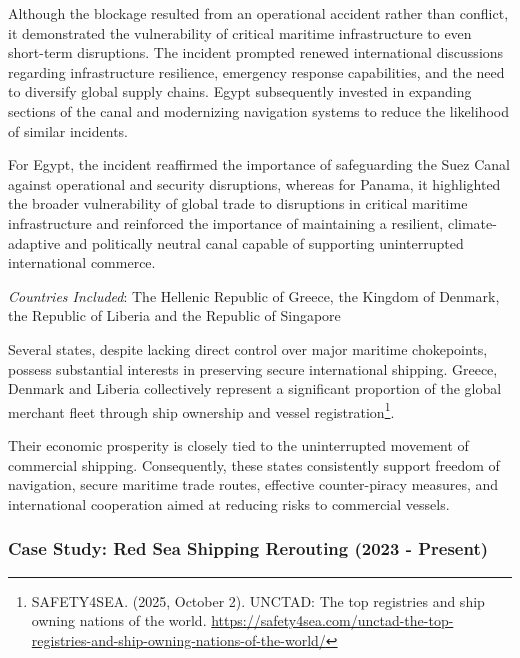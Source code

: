 Although the blockage resulted from an operational accident rather than conflict, it demonstrated the vulnerability of critical maritime infrastructure to even short-term disruptions. The incident prompted renewed international discussions regarding infrastructure resilience, emergency response capabilities, and the need to diversify global supply chains. Egypt subsequently invested in expanding sections of the canal and modernizing navigation systems to reduce the likelihood of similar incidents.

For Egypt, the incident reaffirmed the importance of safeguarding the Suez Canal against operational and security disruptions, whereas for Panama, it highlighted the broader vulnerability of global trade to disruptions in critical maritime infrastructure and reinforced the importance of maintaining a resilient, climate-adaptive and politically neutral canal capable of supporting uninterrupted international commerce.


\emph{Countries Included}: The Hellenic Republic of Greece, the Kingdom of Denmark, the Republic of Liberia and the Republic of Singapore

Several states, despite lacking direct control over major maritime chokepoints, possess substantial interests in preserving secure international shipping. Greece, Denmark and Liberia collectively represent a significant proportion of the global merchant fleet through ship ownership and vessel registration\footnote{SAFETY4SEA. (2025, October 2). UNCTAD: The top registries and ship owning nations of the world. \url{https://safety4sea.com/unctad-the-top-registries-and-ship-owning-nations-of-the-world/}}.

Their economic prosperity is closely tied to the uninterrupted movement of commercial shipping. Consequently, these states consistently support freedom of navigation, secure maritime trade routes, effective counter-piracy measures, and international cooperation aimed at reducing risks to commercial vessels.

\subsubsection{Case Study: Red Sea Shipping Rerouting (2023 - Present)}

